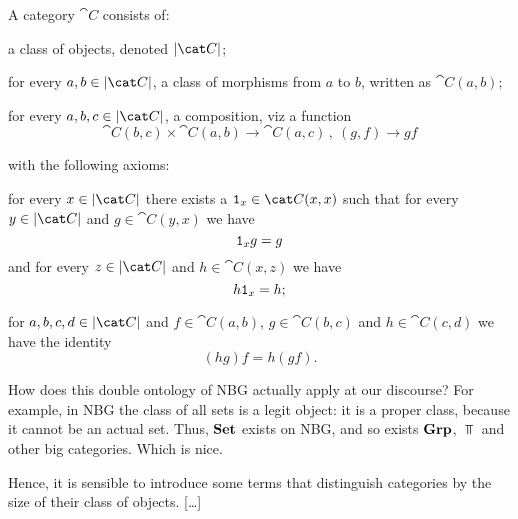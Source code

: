 \begin{definition}[Categories]
A category \(\cat C\) consists of:
\begin{tcbitem}
\item a class of objects, denoted \(\obj{\cat C}\);
\item for every \(a, b \in \obj{\cat C}\), a class of morphisms from \(a\) to \(b\), written as \(\cat C(a, b)\);
\item for every \(a, b, c \in \obj{\cat C}\), a composition, viz a function
\[\cat C(b, c) \times \cat C(a, b) \to \cat C(a, c) \,, \ (g, f) \to gf\]
\end{tcbitem}
with the following axioms:
\begin{tcbenum}
\item for every \(x \in \obj{\cat C}\) there exists a \(\id_x \in \cat C(x, x)\) such that for every \(y \in \obj{\cat C}\) and \(g \in \cat C(y, x)\) we have
\[\mathtt 1_x g = g\]
and for every \(z \in \obj{\cat C}\) and \(h \in \cat C(x, z)\) we have
\[h \mathtt 1_x = h ;\]
\item for \(a, b, c, d \in \obj{\cat C}\) and \(f \in \cat C(a, b)\), \(g \in \cat C(b, c)\) and \(h \in \cat C(c, d)\) we have the identity
\[(h g) f = h (g f) .\]
\end{tcbenum}
\end{definition}

How does this double ontology of NBG actually apply at our discourse? For example, in NBG the class of all sets is a legit object: it is a proper class, because it cannot be an actual set. Thus, \(\mathbf{Set}\) exists on NBG, and so exists \(\mathbf{Grp}\), \(\Top\) and other big categories. Which is nice.

Hence, it is sensible to introduce some terms that distinguish categories by the size of their class of objects. [\dots{}]





